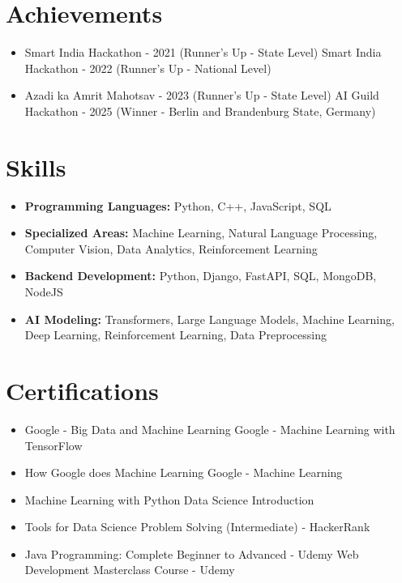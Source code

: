 \documentclass[a4paper,10pt]{article}
\begin{document}
\section*{Achievements}
\begin{itemize}
\item Smart India Hackathon - 2021 (Runner's Up - State Level) \hfill Smart India Hackathon - 2022 (Runner's Up - National Level)
\item Azadi ka Amrit Mahotsav - 2023 (Runner's Up - State Level) \hfill AI Guild Hackathon - 2025 (Winner - Berlin and Brandenburg State, Germany)
\end{itemize}

\section*{Skills}
\begin{itemize}
  \item \textbf{Programming Languages:} Python, C++, JavaScript, SQL
  \item \textbf{Specialized Areas:} Machine Learning, Natural Language Processing, Computer Vision, Data Analytics, Reinforcement Learning
  \item \textbf{Backend Development:} Python, Django, FastAPI, SQL, MongoDB, NodeJS
  \item \textbf{AI Modeling:} Transformers, Large Language Models, Machine Learning, Deep Learning, Reinforcement Learning, Data Preprocessing
\end{itemize}

\section*{Certifications}
\begin{itemize}
\item Google - Big Data and Machine Learning \hfill Google - Machine Learning with TensorFlow
\item How Google does Machine Learning \hfill Google - Machine Learning
\item Machine Learning with Python \hfill Data Science Introduction
\item Tools for Data Science \hfill Problem Solving (Intermediate) - HackerRank
\item Java Programming: Complete Beginner to Advanced - Udemy \hfill Web Development Masterclass Course - Udemy
\end{itemize}
\end{document}

